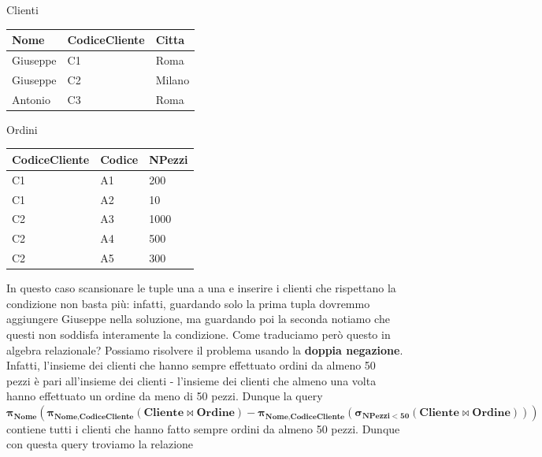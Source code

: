 \documentclass[11pt, a4paper, titlepage, oneside]{scrbook}
\begin{document}
\begin{minipage}[c]{0.45\textwidth}
\begin{center}
    Clienti

\begin{tabular}{|l|l|l|}
\hline
\textbf{Nome} & \textbf{CodiceCliente} & \textbf{Citta} \\ \hline
Giuseppe & C1 & Roma \\
Giuseppe & C2 & Milano \\
Antonio & C3 & Roma  \\ \hline
\end{tabular}
\end{center}
\end{minipage}\hfill
\begin{minipage}[c]{0.45\textwidth}
\begin{center}
    Ordini

\begin{tabular}{|l|l|l|}
\hline
\textbf{CodiceCliente} & \textbf{Codice} & \textbf{NPezzi} \\ \hline
C1 & A1 & 200 \\
C1 & A2 & 10 \\
C2 & A3 & 1000 \\
C2 & A4 & 500 \\
C2 & A5 & 300 \\ \hline
\end{tabular}
\end{center}
\end{minipage}

In questo caso scansionare le tuple una a una e inserire i clienti che rispettano la condizione non basta più: infatti, guardando solo la prima tupla dovremmo aggiungere Giuseppe nella soluzione, ma guardando poi la seconda notiamo che questi non soddisfa interamente la condizione. Come traduciamo però questo in algebra relazionale? Possiamo risolvere il problema usando la \textbf{doppia negazione}. Infatti, l'insieme dei clienti che hanno sempre effettuato ordini da almeno 50 pezzi è pari all'insieme dei clienti - l'insieme dei clienti che almeno una volta hanno effettuato un ordine da meno di 50 pezzi. Dunque la query $\bm{\pi_{\textbf{Nome}}(\pi_{\textbf{Nome}, \textbf{CodiceCliente}}(\textbf{Cliente} \bowtie \textbf{Ordine}) - \pi_{\textbf{Nome}, \textbf{CodiceCliente}}(\sigma_{\textbf{NPezzi}<50}(\textbf{Cliente} \bowtie \textbf{Ordine})))}$ contiene tutti i clienti che hanno fatto sempre ordini da almeno 50 pezzi. Dunque con questa query troviamo la relazione
\end{document}
